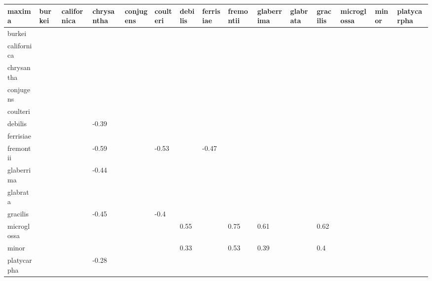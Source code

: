\begin{table}[ht]
\centering
\begingroup\fontsize{5pt}{5pt}\selectfont
\begin{tabular}{lllllllllllllll}
  \hline
maxima & burkei & californica & chrysantha & conjugens & coulteri & debilis & ferrisiae & fremontii & glaberrima & glabrata & gracilis & microglossa & minor & platycarpha \\ 
  \hline
burkei &  &  &  &  &  &  &  &  &  &  &  &  &  &  \\ 
  californica &  &  &  &  &  &  &  &  &  &  &  &  &  &  \\ 
  chrysantha &  &  &  &  &  &  &  &  &  &  &  &  &  &  \\ 
  conjugens &  &  &  &  &  &  &  &  &  &  &  &  &  &  \\ 
  coulteri &  &  &  &  &  &  &  &  &  &  &  &  &  &  \\ 
  debilis &  &  & -0.39 &  &  &  &  &  &  &  &  &  &  &  \\ 
  ferrisiae &  &  &  &  &  &  &  &  &  &  &  &  &  &  \\ 
  fremontii &  &  & -0.59 &  & -0.53 &  & -0.47 &  &  &  &  &  &  &  \\ 
  glaberrima &  &  & -0.44 &  &  &  &  &  &  &  &  &  &  &  \\ 
  glabrata &  &  &  &  &  &  &  &  &  &  &  &  &  &  \\ 
  gracilis &  &  & -0.45 &  & -0.4 &  &  &  &  &  &  &  &  &  \\ 
  microglossa &  &  &  &  &  & 0.55 &  & 0.75 & 0.61 &  & 0.62 &  &  &  \\ 
  minor &  &  &  &  &  & 0.33 &  & 0.53 & 0.39 &  & 0.4 &  &  &  \\ 
  platycarpha &  &  & -0.28 &  &  &  &  &  &  &  &  &  &  &  \\ 
   \hline
\end{tabular}
\endgroup
\end{table}
